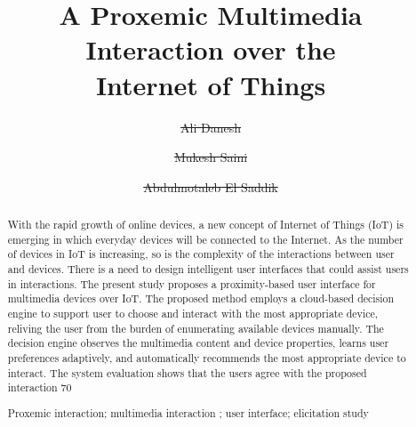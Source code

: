 \documentclass[runningheads,a4paper]{llncs}
\newcommand{\keywords}[1]{\par\addvspace\baselineskip
\noindent\keywordname\enspace\ignorespaces#1}
\providecommand{\DIFadd}[1]{{\protect\color{blue}\uwave{#1}}} %
\providecommand{\DIFdel}[1]{{\protect\color{red}\sout{#1}}}                      %
\providecommand{\DIFaddbegin}{} %
\providecommand{\DIFaddend}{} %
\providecommand{\DIFdelbegin}{} %
\providecommand{\DIFdelend}{} %
\newcommand{\DIFscaledelfig}{0.5}
\newlength{\DIFdelgraphicswidth} %
\newlength{\DIFdelgraphicsheight} %
\newcommand{\DIFaddincludegraphics}[2][]{{\color{blue}\fbox{\DIFOincludegraphics[#1]{#2}}}} %
\newcommand{\DIFdelincludegraphics}[2][]{%
\sbox{\DIFdelgraphicsbox}{\DIFOincludegraphics[#1]{#2}}%
\settoboxwidth{\DIFdelgraphicswidth}{\DIFdelgraphicsbox} %
\settoboxtotalheight{\DIFdelgraphicsheight}{\DIFdelgraphicsbox} %
\scalebox{\DIFscaledelfig}{%
\parbox[b]{\DIFdelgraphicswidth}{\usebox{\DIFdelgraphicsbox}\\[-\baselineskip] \rule{\DIFdelgraphicswidth}{0em}}\llap{\resizebox{\DIFdelgraphicswidth}{\DIFdelgraphicsheight}{%
\setlength{\unitlength}{\DIFdelgraphicswidth}%
\begin{picture}(1,1)%
\thicklines\linethickness{2pt} %
{\color[rgb]{1,0,0}\put(0,0){\framebox(1,1){}}}%
{\color[rgb]{1,0,0}\put(0,0){\line( 1,1){1}}}%
{\color[rgb]{1,0,0}\put(0,1){\line(1,-1){1}}}%
\end{picture}%
}\hspace*{3pt}}} %
} %
\DeclareRobustCommand{\DIFaddbegin}{\DIFOaddbegin \let\includegraphics\DIFaddincludegraphics} %
\DeclareRobustCommand{\DIFaddend}{\DIFOaddend \let\includegraphics\DIFOincludegraphics} %
\DeclareRobustCommand{\DIFdelbegin}{\DIFOdelbegin \let\includegraphics\DIFdelincludegraphics} %
\DeclareRobustCommand{\DIFdelend}{\DIFOaddend \let\includegraphics\DIFOincludegraphics} %
\begin{document}
\mainmatter  %

\title{A Proxemic Multimedia Interaction over the\\Internet of Things}


%
%
\author{\DIFdelbegin \DIFdel{Ali Danesh}\DIFdelend \DIFaddbegin \DIFadd{Sonu}\DIFaddend %
\and \DIFdelbegin \DIFdel{Mukesh Saini}\DIFdelend \DIFaddbegin \DIFadd{HIMANSHU}\DIFaddend \and  \DIFdelbegin \DIFdel{Abdulmotaleb El Saddik}\DIFdelend \DIFaddbegin \DIFadd{GURKARAN}\DIFaddend }%


%
%

\maketitle


\begin{abstract}
With the rapid growth of online devices, a new concept of
Internet of Things (IoT) is emerging in which everyday devices will be connected to the Internet. As the number of devices in IoT is increasing, so is the complexity of the interactions between user and devices. There is a need to design intelligent user interfaces that could assist users in interactions. The present study proposes a proximity-based user interface for multimedia devices over IoT. The proposed method employs a cloud-based decision engine to support user to choose and interact with the most appropriate device, reliving the user from the burden of enumerating available devices manually. The decision engine observes the multimedia content and device properties, learns user preferences adaptively, and automatically recommends the most appropriate device to interact. The system evaluation shows that the users agree with the proposed interaction 70%
\keywords{Proxemic interaction; multimedia interaction ; user interface; elicitation study}
\end{abstract}
\end{document}
